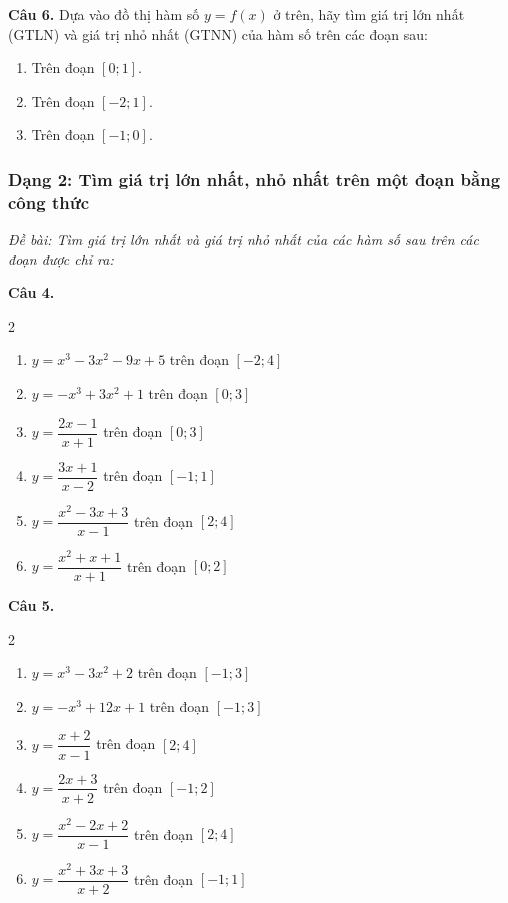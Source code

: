 \documentclass[12pt]{article}
\begin{document}
	\begin{btdo}
		\textbf{Câu 6.} Dựa vào đồ thị hàm số $y=f(x)$ ở trên, hãy tìm giá trị lớn nhất (GTLN) và giá trị nhỏ nhất (GTNN) của hàm số trên các đoạn sau:
		\begin{enumerate}[label=\alph*)]
			\item Trên đoạn $[0; 1]$.
			\item Trên đoạn $[-2; 1]$.
			\item Trên đoạn $[-1; 0]$.
		\end{enumerate}
	\end{btdo}
	
	\subsubsection{Dạng 2: Tìm giá trị lớn nhất, nhỏ nhất trên một đoạn bằng công thức}
	\textit{Đề bài: Tìm giá trị lớn nhất và giá trị nhỏ nhất của các hàm số sau trên các đoạn được chỉ ra:}
	
	\begin{btxanh}
		\textbf{Câu 4.}
		\begin{multicols}{2}
			\begin{enumerate}[label=\alph*)]
				\item $y = x^3 - 3x^2 - 9x + 5$ trên đoạn $[-2; 4]$
				\item $y = -x^3 + 3x^2 + 1$ trên đoạn $[0; 3]$
				\item $y = \dfrac{2x - 1}{x + 1}$ trên đoạn $[0; 3]$
				\item $y = \dfrac{3x + 1}{x - 2}$ trên đoạn $[-1; 1]$
				\item $y = \dfrac{x^2 - 3x + 3}{x - 1}$ trên đoạn $[2; 4]$
				\item $y = \dfrac{x^2 + x + 1}{x + 1}$ trên đoạn $[0; 2]$
			\end{enumerate}
		\end{multicols}
	\end{btxanh}
	
	\begin{btvang}
		\textbf{Câu 5.}
		\begin{multicols}{2}
			\begin{enumerate}[label=\alph*)]
				\item $y = x^3 - 3x^2 + 2$ trên đoạn $[-1; 3]$
				\item $y = -x^3 + 12x + 1$ trên đoạn $[-1; 3]$
				\item $y = \dfrac{x + 2}{x - 1}$ trên đoạn $[2; 4]$
				\item $y = \dfrac{2x + 3}{x + 2}$ trên đoạn $[-1; 2]$
				\item $y = \dfrac{x^2 - 2x + 2}{x - 1}$ trên đoạn $[2; 4]$
				\item $y = \dfrac{x^2 + 3x + 3}{x + 2}$ trên đoạn $[-1; 1]$
			\end{enumerate}
		\end{multicols}
	\end{btvang}
	
\end{document}
